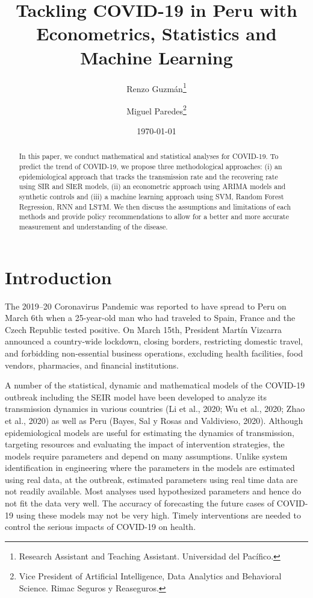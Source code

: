 \documentclass[12pt]{article}
\begin{document}
\begin{titlepage}
\title{Tackling COVID-19 in Peru with Econometrics, Statistics and Machine Learning}
\author{Renzo Guzmán\thanks{Research Assistant and Teaching Assistant. Universidad del Pacífico.} \and Miguel Paredes\thanks{Vice President of Artificial Intelligence, Data Analytics and Behavioral Science. Rimac Seguros y Reaseguros.}}
\date{\today}
\maketitle
\begin{abstract}
\noindent In this paper, we conduct mathematical and statistical analyses for COVID-19. To predict the trend of COVID-19, we propose three methodological approaches: (i) an epidemiological approach that tracks the transmission rate and the recovering rate using SIR and SIER models, (ii) an econometric approach using ARIMA models and synthetic controls and (iii) a machine learning approach using SVM, Random Forest Regression, RNN and LSTM. We then discuss the assumptions and limitations of each methods and provide policy recommendations to allow for a better and more accurate measurement and understanding of the disease.
\vspace{0in}\\
\bigskip
\end{abstract}
\setcounter{page}{0}
\thispagestyle{empty}
\end{titlepage}
\pagebreak \newpage


\doublespacing


\section{Introduction}

The 2019–20 Coronavirus Pandemic was reported to have spread to Peru on March 6th when a 25-year-old man who had traveled to Spain, France and the Czech Republic tested positive. On March 15th, President Martín Vizcarra announced a country-wide lockdown, closing borders, restricting domestic travel, and forbidding non-essential business operations, excluding health facilities, food vendors, pharmacies, and financial institutions.  

A number of the statistical, dynamic and mathematical models of the COVID-19 outbreak including the SEIR model have been developed to analyze its transmission dynamics in various countries (Li et al., 2020; Wu et al., 2020; Zhao et al., 2020) as well as Peru (Bayes, Sal y Rosas and Valdivieso, 2020). Although epidemiological models are useful for estimating the dynamics of transmission, targeting resources and evaluating the impact of intervention strategies, the models require parameters and depend on many assumptions. Unlike system identification in engineering where the parameters in the models are estimated using real data, at the outbreak, estimated parameters using real time data are not readily available. Most analyses used hypothesized parameters and hence do not fit the data very well. The accuracy of forecasting the future cases of COVID-19 using these models may not be very high. Timely interventions are needed to control the serious impacts of COVID-19 on health.
\end{document}
